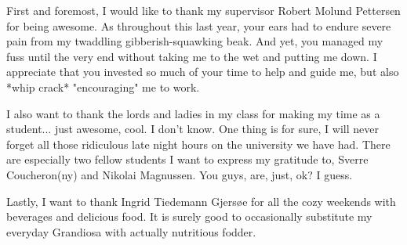 \begin{acknowledgement}
First and foremost, I would like to thank my supervisor Robert Molund Pettersen for being awesome. As throughout this last year, your ears had to endure severe pain from my twaddling gibberish-squawking beak. And yet, you managed my fuss until the very end without taking me to the wet and putting me down. I appreciate that you invested so much of your time to help and guide me, but also *whip crack* "encouraging" me to work.

I also want to thank the lords and ladies in my class for making my time as a student... just awesome, cool. I don't know. One thing is for sure, I will never forget all those ridiculous late night hours on the university we have had. There are especially two fellow students I want to express my gratitude to, Sverre Coucheron(ny) and Nikolai Magnussen. You guys, are, just, ok? I guess.

Lastly, I want to thank Ingrid Tiedemann Gjersøe for all the cozy weekends with beverages and delicious food. It is surely good to occasionally substitute my everyday Grandiosa with actually nutritious fodder.
\end{acknowledgement}